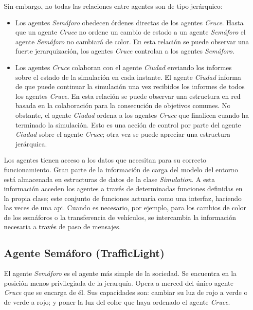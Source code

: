 Sin embargo, no todas las relaciones entre agentes son de tipo jerárquico:
\begin{itemize}
    \item Los agentes \textit{Semáforo} obedecen órdenes directas de los agentes \textit{Cruce}. Hasta que un agente \textit{Cruce} no ordene un cambio de estado a un agente \textit{Semáforo} el agente \textit{Semáforo} no cambiará de color. En esta relación se puede observar una fuerte jerarquización, los agentes \textit{Cruce} controlan a los agentes \textit{Semáforo}.
    \item Los agentes \textit{Cruce} colaboran con el agente \textit{Ciudad} enviando los informes sobre el estado de la simulación en cada instante. El agente \textit{Ciudad} informa de que puede continuar la simulación una vez recibidos los informes de todos los agentes \textit{Cruce}. En esta relación se puede observar una estructura en red basada en la colaboración para la consecución de objetivos comunes. No obstante, el agente \textit{Ciudad} ordena a los agentes \textit{Cruce} que finalicen cuando ha terminado la simulación. Esto es una acción de control por parte del agente \textit{Ciudad} sobre el agente \textit{Cruce}; otra vez se puede apreciar una estructura jerárquica.
\end{itemize}

Los agentes tienen acceso a los datos que necesitan para su correcto funcionamiento. Gran parte de la información de carga del modelo del entorno está almacenada en estructuras de datos de la clase \textit{Simulation}. A esta información acceden los agentes a través de determinadas funciones definidas en la propia clase; este conjunto de funciones actuaría como una interfaz, haciendo las veces de una \acrshort{api}. Cuando es necesario, por ejemplo, para los cambios de color de los semáforos o la transferencia de vehículos, se intercambia la información necesaria a través de paso de mensajes.

\subsection{Agente Semáforo (TrafficLight)}
El agente \textit{Semáforo} es el agente más simple de la sociedad. Se encuentra en la posición menos privilegiada de la jerarquía. Opera a merced del único agente \textit{Cruce} que se encarga de él. Sus capacidades son: cambiar su luz de rojo a verde o de verde a rojo; y poner la luz del color que haya ordenado el agente \textit{Cruce}. 

